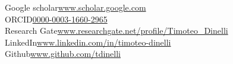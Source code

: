Google scholar\hfill\href{https://scholar.google.com/citations?user=H117wUwAAAAJ&hl=it&oi=ao}{www.scholar.google.com}\\
ORCID\hfill\href{https://orcid.org/0000-0003-1660-2965}{0000-0003-1660-2965}\\
Research Gate\hfill\href{https://www.researchgate.net/profile/Timoteo_Dinelli}{www.researchgate.net/profile/Timoteo\_Dinelli}\\
LinkedIn\hfill\href{https://www.linkedin.com/in/timoteo-dinelli/}{www.linkedin.com/in/timoteo-dinelli}\\
Github\hfill\href{https://github.com/tdinelli}{www.github.com/tdinelli}
